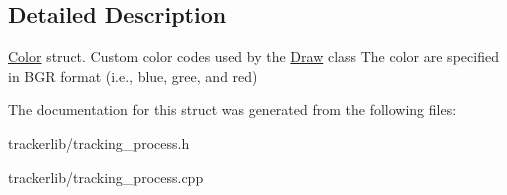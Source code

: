 \subsection{Detailed Description}
\hyperlink{struct_color}{Color} struct. Custom color codes used by the \hyperlink{class_draw}{Draw} class The color are specified in B\+GR format (i.\+e., blue, gree, and red) 

The documentation for this struct was generated from the following files\+:\begin{DoxyCompactItemize}
\item 
trackerlib/tracking\+\_\+process.\+h\item 
trackerlib/tracking\+\_\+process.\+cpp\end{DoxyCompactItemize}
